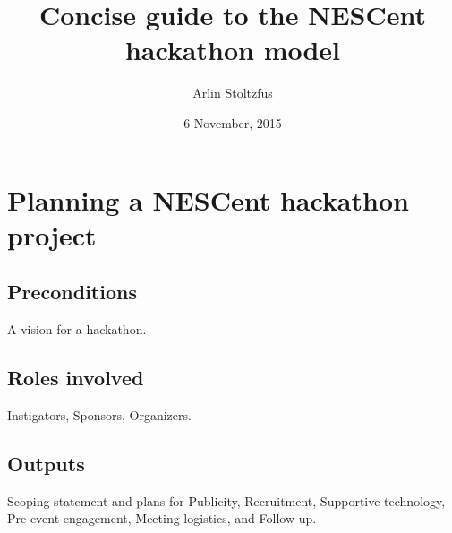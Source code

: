\documentclass[11pt]{article}
\date{6 November, 2015}
\title{Concise guide to the NESCent hackathon model}
\author{Arlin Stoltzfus}
\begin{document}
\renewcommand*\contentsname{Concise guide to planning and staging a NESCent hackathon}
\tableofcontents

\newpage
\section{Planning a NESCent hackathon project}
\subsection{Preconditions}
A vision for a hackathon.

\subsection{Roles involved}
Instigators, Sponsors, Organizers.

\subsection{Outputs}
Scoping statement and plans for Publicity, Recruitment, Supportive technology, Pre-event engagement, Meeting logistics, and Follow-up.
\end{document}
